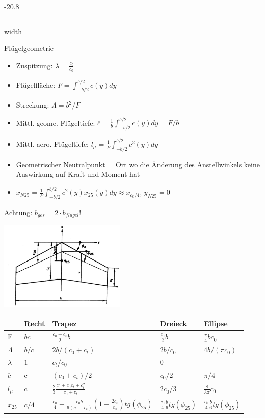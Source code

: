 \documentclass[8pt, landscape, fleqn]{scrartcl}
\makeatletter
\renewcommand{\subsubsection}{\@startsection{subsubsection}{1}{0mm}%
{-2\baselineskip}{0.8\baselineskip}%
{\hrule depth 0.2pt width\columnwidth\vspace*{1.2em}\normalsize\bfseries\rmfamily}}
\makeatother
\begin{document}
\begin{multicols*}{3}
\subsubsection{Flügelgeometrie}

\begin{itemize}
    \item Zuspitzung: $\lambda = \frac{c_t}{c_0}$
    \item Flügelfläche: $F = \int_{-b/2}^{b/2} c(y) dy$ 
    \item Streckung: $\Lambda = b^2 /F$
    \item Mittl. geome. Flügeltiefe: $\overline{c} = \frac{1}{b} \int_{-b/2}^{b/2} c(y) dy = F/b$ 
    \item Mittl. aero. Flügeltiefe: $l_\mu = \frac{1}{F} \int_{-b/2}^{b/2} c^2(y) dy $
    \item Geometrischer Neutralpunkt = Ort wo die Änderung des Anstellwinkels keine Auswirkung auf Kraft und Moment hat
    \item $x_{N25} = \frac{1}{F} \int_{-b/2}^{b/2} c^2(y) x_{25}(y) dy \approx x_{c_0/4}$, $y_{N25} = 0$
\end{itemize}

Achtung: $b_{ges} = 2\cdot b_{flugel}$!

\begin{center}
    \includegraphics[width = 6cm]{Fluegelgeometrie-1.png}
\end{center}
\begin{tabular}{ l | l l l l}
    & Recht & Trapez & Dreieck & Ellipse \\ 
    \hline
    F & $bc$ & $\frac{c_0+c_t}{2}b$ & $\frac{c_0}{2}b$ & $\frac{\pi}{4}b c_0$ \\ 
    \hline 
    $\Lambda$ & $b/c$ & $2b/(c_0+c_t)$ & $2b/c_0$ & $4b/(\pi c_0)$ \\
    \hline
    $\lambda$ & $1$ & $c_t/c_0$ & 0 & - \\
    \hline
    $\overline{c}$ & c & $(c_0+c_t)/2$ & $c_0/2$ & $\pi/4$ \\
    \hline
    $l_\mu$ & c & $\frac{2}{3}\frac{c_0^2+c_0c_t+c_t^2}{c_0+c_t}$ & $2c_0/3$ & $\frac{8}{3\pi}c_0$ \\
    \hline
    $x_{25}$ & $c/4$ & $\frac{c_0}{4}+\frac{c_0 b}{6(c_0+c_t)}(1+\frac{2c_t}{c_0})tg(\phi_{25})$ & $\frac{c_0}{4}\frac{b}{6}tg(\phi_{25})$ & $\frac{c_0}{4}\frac{b}{6}tg(\phi_{25})$ \\
    \hline
\end{tabular}


\end{multicols*}
\end{document}
